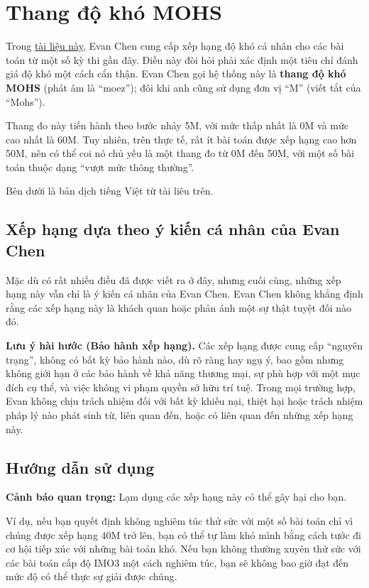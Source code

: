 \documentclass[../imo-training-open-book.tex]{subfiles}
\begin{document}
\section*{Thang độ khó MOHS}

Trong \href{https://web.evanchen.cc/upload/MOHS-hardness.pdf}{tài liệu này},
Evan Chen cung cấp xếp hạng độ khó cá nhân cho các bài toán từ một số kỳ thi gần đây.
Điều này đòi hỏi phải xác định một tiêu chí đánh giá độ khó một cách cẩn thận.
Evan Chen gọi hệ thống này là \textbf{thang độ khó MOHS} (phát âm là “moez”);
đôi khi anh cũng sử dụng đơn vị “M” (viết tắt của “Mohs”).

Thang đo này tiến hành theo bước nhảy 5M, với mức thấp nhất là 0M và mức cao nhất là 60M.
Tuy nhiên, trên thực tế, rất ít bài toán được xếp hạng cao hơn 50M,
nên có thể coi nó chủ yếu là một thang đo từ 0M đến 50M, với một số bài toán thuộc dạng “vượt mức thông thường”.

Bên dưới là bản dịch tiếng Việt từ tài liêu trên.

\subsection*{Xếp hạng dựa theo ý kiến cá nhân của Evan Chen}

Mặc dù có rất nhiều điều đã được viết ra ở đây, nhưng cuối cùng, những xếp hạng này vẫn chỉ là ý kiến cá nhân của Evan Chen.
Evan Chen không khẳng định rằng các xếp hạng này là khách quan hoặc phản ánh một sự thật tuyệt đối nào đó.

\textbf{Lưu ý hài hước (Bảo hành xếp hạng).} Các xếp hạng được cung cấp “nguyên trạng”, không có bất kỳ bảo hành nào,
dù rõ ràng hay ngụ ý, bao gồm nhưng không giới hạn ở các bảo hành về khả năng thương mại, sự phù hợp với một mục đích cụ thể,
và việc không vi phạm quyền sở hữu trí tuệ. Trong mọi trường hợp, Evan không chịu trách nhiệm đối với bất kỳ khiếu nại,
thiệt hại hoặc trách nhiệm pháp lý nào phát sinh từ, liên quan đến, hoặc có liên quan đến những xếp hạng này.

\subsection*{Hướng dẫn sử dụng}

\textbf{Cảnh báo quan trọng:} Lạm dụng các xếp hạng này có thể gây hại cho bạn.

Ví dụ, nếu bạn quyết định không nghiêm túc thử sức với một số bài toán chỉ vì chúng được xếp hạng 40M trở lên,
bạn có thể tự làm khó mình bằng cách tước đi cơ hội tiếp xúc với những bài toán khó.
Nếu bạn không thường xuyên thử sức với các bài toán cấp độ IMO3 một cách nghiêm túc,
bạn sẽ không bao giờ đạt đến mức độ có thể thực sự giải được chúng. 
\end{document}
